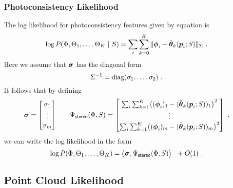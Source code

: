 \subsubsection{Photoconsistency Likelihood}
The log likelihood for photoconsistency features given by equation
 is
\begin{equation}
  \label{eq:stereo-loglik2}
  \log P(\Features,\AuxFeatures_1,\ldots,\AuxFeatures_{\NumViews}
            ~|~ \Seam) 
  =
  \sum_i \sum_{k=0}^{\NumViews} 
    \|\Feature_i-\ComputedAuxFeature_k(\Pixel_i;\Seam)\|_{\StereoCov} ~.
\end{equation}
Here we assume that $\StereoModel$ has the diagonal form
\begin{equation}
  \StereoCov^{-1} = \diag(\StereoCoef_1,\ldots,\StereoCoef_2) ~.
\end{equation}
It follows that by defining
\begin{align}
  \StereoModel =
  \begin{bmatrix}
    \StereoCoef_1 \\
    \vdots \\
    \StereoCoef_m
  \end{bmatrix}
  & \quad &  
  \JointFtr_{\textsf{stereo}}(\Features,\Seam) =
  \begin{bmatrix}
    \sum_i \sum_{k=1}^K \bigl(
      (\Feature_i)_1 - (\ComputedAuxFeature_k(\Pixel_i;\Seam))_1
    \bigr)^2\\
    \vdots \\
    \sum_i \sum_{k=1}^K \bigl(
      (\Feature_i)_m - (\ComputedAuxFeature_k(\Pixel_i;\Seam))_m
    \bigr)^2
  \end{bmatrix}~.
\end{align}
we can write the log likelihood  in the form
\begin{equation}
  \label{eq:linear-stereo-model}
  \log P(\Features,\AuxFeatures_1,\ldots,\AuxFeatures_{\NumViews})
  =
  \bigl\langle
    \StereoModel, \JointFtr_{\textsf{stereo}}(\Features,\Seam)
  \bigr\rangle ~~ + O(1) ~.
\end{equation}

\subsection{Point Cloud Likelihood}

